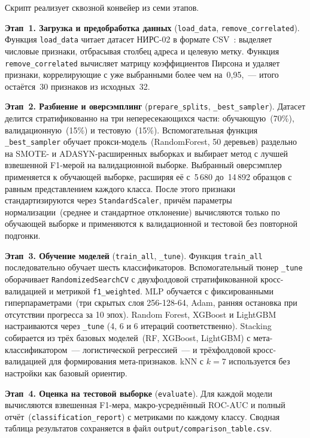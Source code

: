 Скрипт реализует сквозной конвейер из семи этапов.

\textbf{Этап~1. Загрузка и предобработка данных} (\texttt{load\_data}, \texttt{remove\_correlated}). Функция \texttt{load\_data} читает датасет НИРС-02 в формате CSV~\cite{github_repo_nirs2}: выделяет числовые признаки, отбрасывая столбец адреса и целевую метку. Функция \texttt{remove\_correlated} вычисляет матрицу коэффициентов Пирсона и удаляет признаки, коррелирующие с уже выбранными более чем на~0,95,~--- итого остаётся~30 признаков из исходных~32.

\textbf{Этап~2. Разбиение и оверсэмплинг} (\texttt{prepare\_splits}, \texttt{\_best\_sampler}). Датасет делится стратификованно на три непересекающихся части: обучающую~(70\%), валидационную~(15\%) и тестовую~(15\%). Вспомогательная функция \texttt{\_best\_sampler} обучает прокси-модель~(RandomForest, 50 деревьев) раздельно на SMOTE- и ADASYN-расширенных выборках и выбирает метод с лучшей взвешенной F1-мерой на валидационной выборке. Выбранный оверсэмплер применяется к обучающей выборке, расширяя её с~5\,680 до~14\,892 образцов с равным представлением каждого класса. После этого признаки стандартизируются через \texttt{StandardScaler}, причём параметры нормализации~(среднее и стандартное отклонение) вычисляются только по обучающей выборке и применяются к валидационной и тестовой без повторной подгонки.

\textbf{Этап~3. Обучение моделей} (\texttt{train\_all}, \texttt{\_tune}). Функция \texttt{train\_all} последовательно обучает шесть классификаторов. Вспомогательный тюнер \texttt{\_tune} оборачивает \texttt{RandomizedSearchCV} с двухфолдовой стратификованной кросс-валидацией и метрикой \texttt{f1\_weighted}. MLP обучается с фиксированными гиперпараметрами~(три скрытых слоя 256-128-64, Adam, ранняя остановка при отсутствии прогресса за 10 эпох). Random Forest, XGBoost и LightGBM настраиваются через \texttt{\_tune} (4, 6 и 6 итераций соответственно). Stacking собирается из трёх базовых моделей~(RF, XGBoost, LightGBM) с мета-классификатором~--- логистической регрессией~--- и трёхфолдовой кросс-валидацией для формирования мета-признаков. kNN с $k=7$ используется без настройки как базовый ориентир.

\textbf{Этап~4. Оценка на тестовой выборке} (\texttt{evaluate}). Для каждой модели вычисляются взвешенная F1-мера, макро-усреднённый ROC-AUC и полный отчёт~(\texttt{classification\_report}) с метриками по каждому классу. Сводная таблица результатов сохраняется в файл \texttt{output/comparison\_table.csv}.


